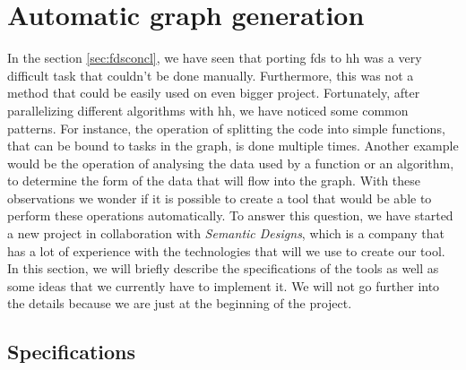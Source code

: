 
\clearpage{}
\section{Automatic graph generation}

In the section \ref{sec:fdsconcl}, we have seen that porting \gls{fds} to
\gls{hh} was a very difficult task that couldn't be done manually. Furthermore,
this was not a method that could be easily used on even bigger project.
Fortunately, after parallelizing different algorithms with \gls{hh}, we have
noticed some common patterns. For instance, the operation of splitting the code
into simple functions, that can be bound to tasks in the graph, is done multiple
times. Another example would be the operation of analysing the data used by a
function or an algorithm, to determine the form of the data that will flow into
the graph. With these observations we wonder if it is possible to create a tool
that would be able to perform these operations automatically. To answer this
question, we have started a new project in collaboration with \textit{Semantic
Designs}, which is a company that has a lot of experience with the technologies
that will we use to create our tool. In this section, we will briefly describe
the specifications of the tools as well as some ideas that we currently have to
implement it. We will not go further into the details because we are just at the
beginning of the project.

\subsection{Specifications}

